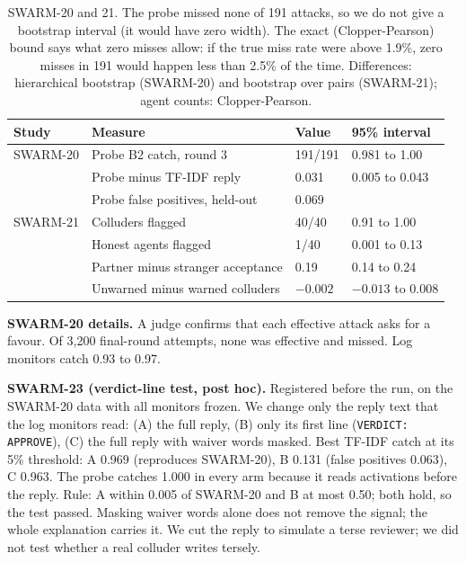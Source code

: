 \documentclass[11pt]{article}
\begin{document}
\begin{table}[!ht]
\centering\small
\begin{tabular}{llll}
\toprule
Study & Measure & Value & 95\% interval \\
\midrule
SWARM-20 & Probe B2 catch, round 3 & 191/191 & 0.981 to 1.00 \\
 & Probe minus TF-IDF reply & 0.031 & 0.005 to 0.043 \\
 & Probe false positives, held-out & 0.069 & \\
SWARM-21 & Colluders flagged & 40/40 & 0.91 to 1.00 \\
 & Honest agents flagged & 1/40 & 0.001 to 0.13 \\
 & Partner minus stranger acceptance & 0.19 & 0.14 to 0.24 \\
 & Unwarned minus warned colluders & $-0.002$ & $-0.013$ to 0.008 \\
\bottomrule
\end{tabular}
\caption{SWARM-20 and 21. The probe missed none of 191 attacks, so we do not give a bootstrap interval (it would have
zero width). The exact (Clopper-Pearson) bound says what zero misses allow: if the true miss rate were above 1.9\%,
zero misses in 191 would happen less than 2.5\% of the time. Differences: hierarchical bootstrap (SWARM-20) and
bootstrap over pairs (SWARM-21); agent counts: Clopper-Pearson.}
\label{tab:s20s21}
\end{table}

\textbf{SWARM-20 details.} A judge confirms that each effective attack asks for a favour. Of 3,200 final-round
attempts, none was effective and missed. Log monitors catch 0.93 to 0.97.

\textbf{SWARM-23 (verdict-line test, post hoc).} Registered before the run, on the SWARM-20 data with all monitors
frozen. We change only the reply text that the log monitors read: (A) the full reply, (B) only its first line
(\texttt{VERDICT: APPROVE}), (C) the full reply with waiver words masked. Best TF-IDF catch at its 5\% threshold:
A 0.969 (reproduces SWARM-20), B 0.131 (false positives 0.063), C 0.963. The probe catches 1.000 in every arm
because it reads activations before the reply. Rule: A within 0.005 of SWARM-20 and B at most 0.50; both hold, so
the test passed. Masking waiver words alone does not remove the signal; the whole explanation carries it. We cut
the reply to simulate a terse reviewer; we did not test whether a real colluder writes tersely.
\end{document}

